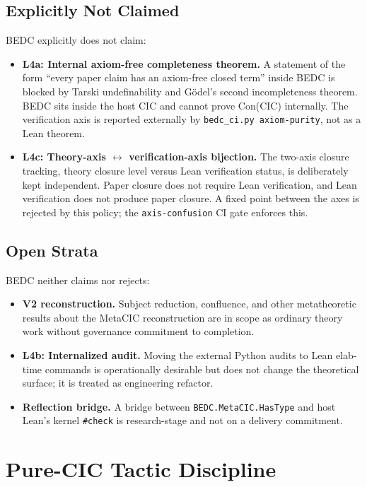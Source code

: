 \subsection{Explicitly Not Claimed}\label{subsec:self-comp-not-claimed}

BEDC explicitly does not claim:
\begin{itemize}
  \item \textbf{L4a: Internal axiom-free completeness theorem.} A statement of the form ``every paper claim has an axiom-free closed term'' inside BEDC is blocked by Tarski undefinability and G\"{o}del's second incompleteness theorem. BEDC sits inside the host CIC and cannot prove Con(CIC) internally. The verification axis is reported externally by \texttt{bedc\_ci.py axiom-purity}, not as a Lean theorem.
  \item \textbf{L4c: Theory-axis $\leftrightarrow$ verification-axis bijection.} The two-axis closure tracking, theory closure level versus Lean verification status, is deliberately kept independent. Paper closure does not require Lean verification, and Lean verification does not produce paper closure. A fixed point between the axes is rejected by this policy; the \texttt{axis-confusion} CI gate enforces this.
\end{itemize}

\subsection{Open Strata}\label{subsec:self-comp-open}

BEDC neither claims nor rejects:
\begin{itemize}
  \item \textbf{V2 reconstruction.} Subject reduction, confluence, and other metatheoretic results about the MetaCIC reconstruction are in scope as ordinary theory work without governance commitment to completion.
  \item \textbf{L4b: Internalized audit.} Moving the external Python audits to Lean elab-time commands is operationally desirable but does not change the theoretical surface; it is treated as engineering refactor.
  \item \textbf{Reflection bridge.} A bridge between \texttt{BEDC.MetaCIC.HasType} and host Lean's kernel \texttt{\#check} is research-stage and not on a delivery commitment.
\end{itemize}

\section{Pure-CIC Tactic Discipline}\label{sec:pure-cic-tactics}

